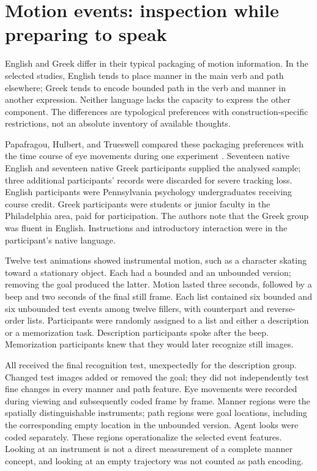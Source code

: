 \section{Motion events: inspection while preparing to speak}
\label{sec:p19-lc-motion-production}

English and Greek differ in their typical packaging of motion information.
In the selected studies, English tends to place manner in the main verb
and path elsewhere; Greek tends to encode bounded path in the verb and
manner in another expression. Neither language lacks the capacity to
express the other component. The differences are typological preferences
with construction-specific restrictions, not an absolute inventory of
available thoughts.

Papafragou, Hulbert, and Trueswell compared these packaging preferences
with the time course of eye movements during one experiment
\cite[pp.~155--184]{PapafragouHulbertTrueswell2008EventPerceptionLC}.
Seventeen native English and seventeen native Greek participants supplied
the analysed sample; three additional participants' records were discarded
for severe tracking loss. English participants were Pennsylvania psychology
undergraduates receiving course credit. Greek participants were students
or junior faculty in the Philadelphia area, paid for participation.
The authors note that the Greek group was fluent in English. Instructions
and introductory interaction were in the participant's native language.

Twelve test animations showed instrumental motion, such as a character
skating toward a stationary object. Each had a bounded and an unbounded
version; removing the goal produced the latter. Motion lasted three
seconds, followed by a beep and two seconds of the final still frame.
Each list contained six bounded and six unbounded test events among twelve
fillers, with counterpart and reverse-order lists. Participants were
randomly assigned to a list and either a description or a memorization
task. Description participants spoke after the beep. Memorization
participants knew that they would later recognize still images.

All received the final recognition test, unexpectedly for the description
group. Changed test images added or removed the goal; they did not
independently test fine changes in every manner and path feature.
Eye movements were recorded during viewing and subsequently coded
frame by frame. Manner regions were the spatially distinguishable
instruments; path regions were goal locations, including the corresponding
empty location in the unbounded version. Agent looks were coded separately.
These regions operationalize the selected event features. Looking at an
instrument is not a direct measurement of a complete manner concept, and
looking at an empty trajectory was not counted as path encoding.

